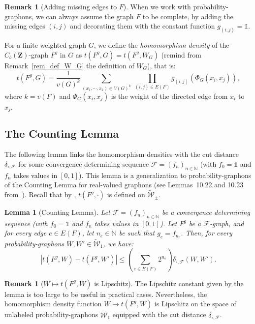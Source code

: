 \documentclass{amsart}
\theoremstyle{plain}
\newtheorem{lemme}[Th]{Lemma}
\theoremstyle{definition}
\newtheorem{remark}[Th]{Remark}
\newcommand{\Space}{\mathbf{Z}}
\newcommand{\signed}{\pm}
\newcommand{\CbFunct}{C_b(\Space)}
\newcommand{\UGraphon}{\widetilde{\mathcal{W}}_1}
\newcommand{\UKernel}{\widetilde{\mathcal{W}}_{\signed}}
\newcommand{\ddcutF}{\delta_{\square,\mathcal{F}}}
\newcommand{\F}{\mathcal{F}}
\newcommand{\un}{\mathds{1}}
\newcommand{\N}{\mathbb{N}}
\begin{document}
\begin{remark}[Adding missing edges to $F$]
When we work with probability-graphons,
we can always assume the graph $F$ to be complete,
by adding the missing edges $(i,j)$ and decorating them
with the constant function $g_{(i,j)} = \un$.
\end{remark}

For a finite weighted graph $G$, we define the  
\emph{homomorphism density} of the $\CbFunct$-graph $F^g$ in $G$ as $t(F^g,G) = t(F^g,W_G)$
(remind from Remark~\ref{rem_def_W_G} the definition of $W_G$), that is:
\begin{equation*}
t(F^g, G) = \frac{1}{v(G)^{k}} \sum_{(x_1,\cdots, x_{k}) \in V(G)^{k}}\ \prod_{(i,j)\in E(F)} g_{(i,j)}( \Phi_G(x_i,x_j) )
 ,
\end{equation*}
where $k=v(F)$ and $\Phi_G(x_i,x_j)$ is the weight of the directed edge from $x_i$ to $x_j$.



\subsection{The Counting Lemma}

The following lemma links
the homomorphism densities with the cut distance $\ddcutF$
for some convergence determining sequence
	$\F = (f_n)_{n\in\N}$ (with $f_0 = \un$ and $f_n$  takes values  in  $[0,1]$).
This lemma is a generalization to probability-graphons
of the Counting Lemma for real-valued graphons
(see Lemmas~10.22 and 10.23 from~\cite{Lovasz}).
Recall that by , $t(F^g,\cdot)$ is defined on $\UKernel$.

\begin{lemme}[Counting Lemma]\label{CountingLemma}
Let $\F= (f_n)_{n\in \N}$ be a convergence determining sequence (with $f_0=\un$ and $f_n$  takes values  in  $[0,1]$).
Let $F^g$ be a $\F$-graph,
and for every edge $e\in E(F)$,
	let $n_e\in\N$ be such that $g_e = f_{n_e}$.
Then, for every probability-graphons $W, W' \in \UGraphon$, we have:
\[ |t(F^g,W) - t(F^g,W')| \leq \left( \sum_{e\in E(F)} 2^{n_e} \right)   \ddcutF(W,W')
 . \]
\end{lemme}


\begin{remark}[$W\mapsto t(F^g,W)$ is Lipschitz]
The Lipschitz constant given by the lemma
is too large to be useful in practical cases.
Nevertheless, the homomorphism density function 
	$W \mapsto t(F^g,W)$ is Lipschitz 
on the space of unlabeled probability-graphons $\UGraphon$
equipped with the cut distance $\ddcutF$.
\end{remark}
\end{document}
